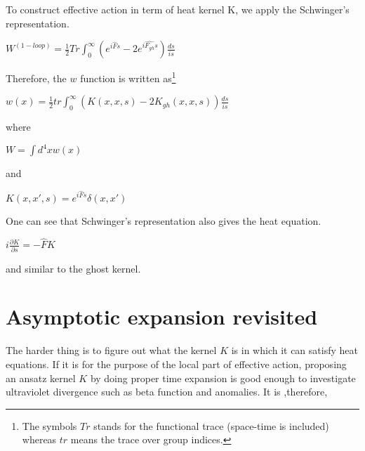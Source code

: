 \documentclass[a4paper,12 pt]{article}
\begin{document}
To construct effective action in term of heat kernel K, we apply
the Schwinger's representation.
\begin{center}
 $ W^{(1-loop)} = \frac{1}{2}Tr\int_{0}^{\infty}(e^{i \hat{F} s}- 2 e^{i\hat{F_{gh} } s})\frac{d s}{i s} $
\end{center}
Therefore, the $ w $ function is written as\footnote{The symbols
$Tr$ stands for the functional trace (space-time is included)
whereas $ tr $ means the trace over group indices.}
\begin{center}
$w(x)=\frac{1}{2}tr\int_{0}^{\infty}(K(x,x,s)-2K_{gh}(x,x,s))\frac{ds}{is}$
\end{center}
where
\begin{center}
$ W  =  \int d^{4}x w(x) $
\end{center}
and
\begin{center}
$ K(x,x',s)  =  e^{i\hat{F}s}\delta(x,x')$
 \end{center}
One can see that Schwinger's representation also gives the heat
equation.
 \begin{center}
 $ i \frac{\partial K}{\partial s} = - \hat{F} K $
\end{center}
and similar to the ghost kernel.

\section{Asymptotic expansion revisited}

The harder thing is to figure out what the kernel $K$ is in which
it can satisfy heat equations. If it is for the purpose of the
local part of effective action, proposing an ansatz kernel $K$ by
doing proper time expansion is good enough to investigate
ultraviolet divergence such as beta function and anomalies. It is
,therefore,
\end{document}
